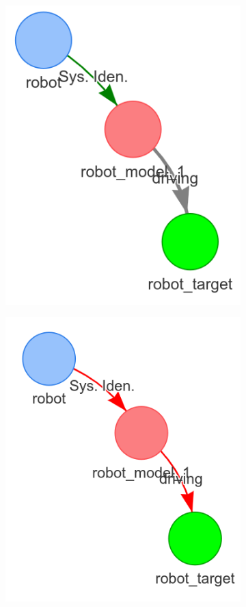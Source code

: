 \begin{figure}[H]
\begin{subfigure}{.3\textwidth}
    \includegraphics[width=\textwidth]{figures/proposed_method/connecting_nodes/failure/fail_3}
    \end{subfigure}
    \begin{subfigure}{.3\textwidth}
    \centering
    \includegraphics[width=\textwidth]{figures/proposed_method/connecting_nodes/failure/fail_4}

\end{subfigure}
\end{figure}
